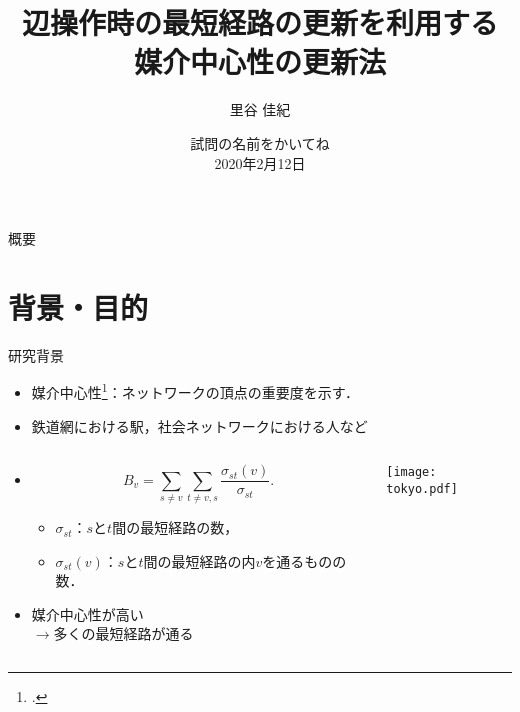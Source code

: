 \documentclass[dvipdfmx,fleqn]{beamer}
\title[媒介中心性更新法]{辺操作時の最短経路の更新を利用する \\ 媒介中心性の更新法}
\author[里谷]{里谷 佳紀}
\institute[情数工研]{情報数理工学研究室}
\date[試問]{\alert{試問の名前をかいてね} \\ 2020年2月12日}
\begin{document}
\makeIMELABtitle

\begin{frame}{概要}
  \tableofcontents
\end{frame}

\section{背景・目的}
\begin{frame}[t]{研究背景}
  \begin{itemize}
  \item \alert{媒介中心性}\footcite{Freeman1977}：ネットワークの頂点の重要度を示す．
  \item[] 鉄道網における駅，社会ネットワークにおける人など
  \end{itemize}
  \begin{columns}[T]
    \begin{column}{.49\textwidth}
      \begin{itemize}
      \item[] \begin{equation*}
        B_v=\sum_{s\neq v}\sum_{t\neq v,s}\frac{\sigma_{st}(v)}{\sigma_{st}}.
      \end{equation*}
        \begin{itemize}
        \item $\sigma_{st}$：$s$と$t$間の最短経路の数，
        \item $\sigma_{st}(v)$：$s$と$t$間の最短経路の内$v$を通るものの数．
        \end{itemize}
        \medskip
      \item 媒介中心性が高い\\$\rightarrow$多くの最短経路が通る
      \end{itemize}
    \end{column}
    \begin{column}{.49\textwidth}
      \texttt{[image: tokyo.pdf]}
    \end{column}
  \end{columns}
\end{frame}
\end{document}
